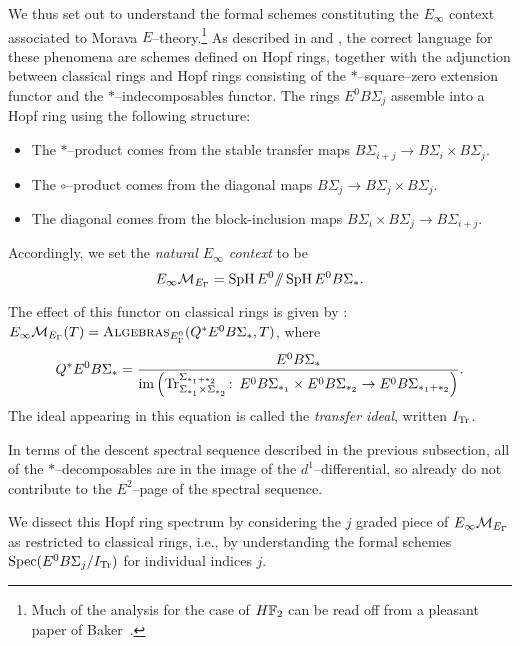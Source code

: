 We thus set out to understand the formal schemes constituting the \(E_\infty\) context associated to Morava \(E\)--theory.\footnote{Much of the analysis for the case of \(\HFtwo\) can be read off from a pleasant paper of Baker~\cite{Baker}.}  As described in  and , the correct language for these phenomena are schemes defined on Hopf rings, together with the adjunction between classical rings and Hopf rings consisting of the \(\ast\)--square--zero extension functor and the \(\ast\)--indecomposables functor.  The rings \(E^0 B\Sigma_j\) assemble into a Hopf ring using the following structure:
\begin{itemize}
    \item The \(\ast\)--product comes from the stable transfer maps \(B\Sigma_{i+j} \to B\Sigma_i \times B\Sigma_j\).
    \item The \(\circ\)--product comes from the diagonal maps \(B\Sigma_j \to B\Sigma_j \times B\Sigma_j\).
    \item The diagonal comes from the block-inclusion maps \(B\Sigma_i \times B\Sigma_j \to B\Sigma_{i+j}\).
\end{itemize}

\begin{definition}
Accordingly, we set the \textit{natural \(E_\infty\) context} to be \[E_\infty\mathcal{M}_{E_\Gamma} = \operatorname{SpH} E^0 /\!\!/ \operatorname{SpH} E^0 B\Sigma_*.\]
\end{definition}

The effect of this functor on classical rings is given by : \(E_\infty\mathcal{M}_{E_\Gamma}(T) = \normalfont\textsc{Algebras}_{E_\Gamma^0}(Q^* E^0 B\Sigma_*, T)\), where \[Q^* E^0 B\Sigma_* = \frac{E^0 B\Sigma_*}{\operatorname{im}\left(\mathrm{Tr}_{\Sigma_{*_1} \times \Sigma_{*_2}}^{\Sigma_{*_1 + *_2}}\colon\thinspace E^0 B\Sigma_{*_1} \times E^0 B\Sigma_{*_2} \to E^0 B\Sigma_{*_1 + *_2}\right)}.\]  The ideal appearing in this equation is called the \textit{transfer ideal}, written \(I_{\mathrm{Tr}}\).

\begin{remark}
In terms of the descent spectral sequence described in the previous subsection, all of the \(*\)--decomposables are in the image of the \(d^1\)--differential, so already do not contribute to the \(E^2\)--page of the spectral sequence.
\end{remark}

We dissect this Hopf ring spectrum by considering the \(j\){\th} graded piece of \(E_\infty\mathcal{M}_{E_\Gamma}\) as restricted to classical rings, i.e., by understanding the formal schemes \(\operatorname{Spec} (E^0 B\Sigma_j / I_{\mathrm{Tr}})\) for individual indices \(j\).

